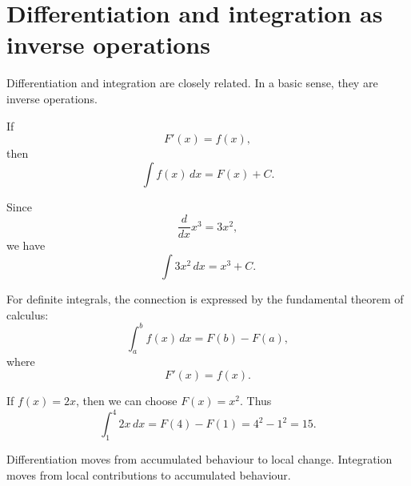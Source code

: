 \section{Differentiation and integration as inverse operations}

Differentiation and integration are closely related. In a basic sense, they are inverse operations.

If
\[
F'(x)=f(x),
\]
then
\[
\int f(x)\,dx=F(x)+C.
\]

\begin{examplebox}
Since
\[
\frac{d}{dx}x^3=3x^2,
\]
we have
\[
\int 3x^2\,dx=x^3+C.
\]
\end{examplebox}

For definite integrals, the connection is expressed by the fundamental theorem of calculus:
\[
\int_a^b f(x)\,dx=F(b)-F(a),
\]
where
\[
F'(x)=f(x).
\]

\begin{examplebox}
If \(f(x)=2x\), then we can choose \(F(x)=x^2\). Thus
\[
\int_1^4 2x\,dx
=
F(4)-F(1)
=
4^2-1^2
=
15.
\]
\end{examplebox}

\begin{summarybox}
Differentiation moves from accumulated behaviour to local change. Integration moves from local contributions to accumulated behaviour.
\end{summarybox}
